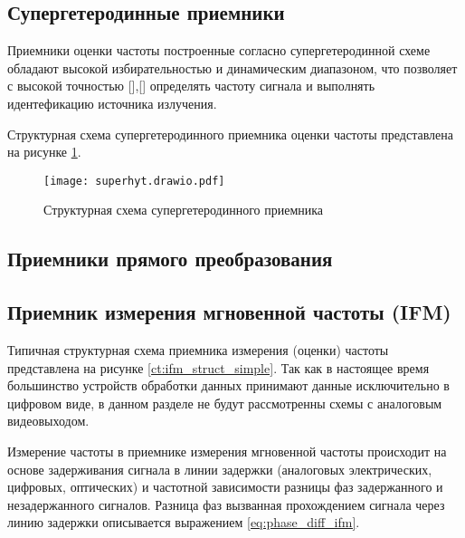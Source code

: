 \subsection{Супергетеродинные приемники}
Приемники оценки частоты построенные согласно супергетеродинной схеме обладают высокой избирательностью и динамическим диапазоном, что позволяет с высокой точностью [],[] определять частоту сигнала и выполнять идентефикацию источника излучения.

Структурная схема супергетеродинного приемника оценки частоты представлена на рисунке \ref{ct:superhyt}.

\begin{figure}[ht]
	\centering
	\texttt{[image: superhyt.drawio.pdf]}	
	\caption{Структурная схема супергетеродинного приемника}
	\label{ct:superhyt}
\end{figure}

\subsection{Приемники прямого преобразования}

\subsection{Приемник измерения мгновенной частоты (IFM)}

Типичная структурная схема приемника измерения (оценки) частоты представлена на рисунке \ref{ct:ifm_struct_simple}. Так как в настоящее время большинство устройств обработки данных принимают данные исключительно в цифровом виде, в данном разделе не будут рассмотренны схемы с аналоговым видеовыходом.

%	

%	

Измерение частоты в приемнике измерения мгновенной частоты происходит на основе задерживания сигнала в линии задержки (аналоговых электрических, цифровых, оптических) и частотной зависимости разницы фаз задержанного и незадержанного сигналов. Разница фаз вызванная прохождением сигнала через линию задержки описывается выражением \eqref{eq:phase_diff_ifm}.

